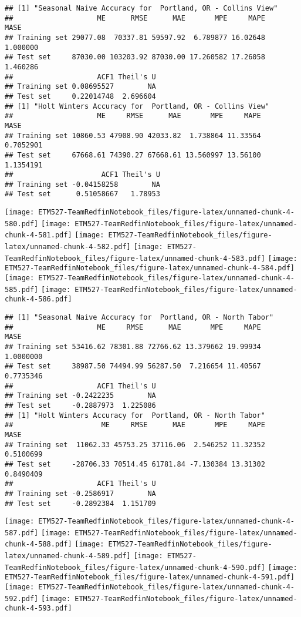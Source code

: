 \documentclass[]{article}
\begin{document}
\begin{verbatim}
## [1] "Seasonal Naive Accuracy for  Portland, OR - Collins View"
##                    ME      RMSE      MAE       MPE     MAPE     MASE
## Training set 29077.08  70337.81 59597.92  6.789877 16.02648 1.000000
## Test set     87030.00 103203.92 87030.00 17.260582 17.26058 1.460286
##                    ACF1 Theil's U
## Training set 0.08695527        NA
## Test set     0.22014748  2.696604
## [1] "Holt Winters Accuracy for  Portland, OR - Collins View"
##                    ME     RMSE      MAE       MPE     MAPE      MASE
## Training set 10860.53 47908.90 42033.82  1.738864 11.33564 0.7052901
## Test set     67668.61 74390.27 67668.61 13.560997 13.56100 1.1354191
##                     ACF1 Theil's U
## Training set -0.04158258        NA
## Test set      0.51058667   1.78953
\end{verbatim}

\texttt{[image: ETM527-TeamRedfinNotebook\_files/figure-latex/unnamed-chunk-4-580.pdf]}
\texttt{[image: ETM527-TeamRedfinNotebook\_files/figure-latex/unnamed-chunk-4-581.pdf]}
\texttt{[image: ETM527-TeamRedfinNotebook\_files/figure-latex/unnamed-chunk-4-582.pdf]}
\texttt{[image: ETM527-TeamRedfinNotebook\_files/figure-latex/unnamed-chunk-4-583.pdf]}
\texttt{[image: ETM527-TeamRedfinNotebook\_files/figure-latex/unnamed-chunk-4-584.pdf]}
\texttt{[image: ETM527-TeamRedfinNotebook\_files/figure-latex/unnamed-chunk-4-585.pdf]}
\texttt{[image: ETM527-TeamRedfinNotebook\_files/figure-latex/unnamed-chunk-4-586.pdf]}

\begin{verbatim}
## [1] "Seasonal Naive Accuracy for  Portland, OR - North Tabor"
##                    ME     RMSE      MAE       MPE     MAPE      MASE
## Training set 53416.62 78301.88 72766.62 13.379662 19.99934 1.0000000
## Test set     38987.50 74494.99 56287.50  7.216654 11.40567 0.7735346
##                    ACF1 Theil's U
## Training set -0.2422235        NA
## Test set     -0.2887973  1.225086
## [1] "Holt Winters Accuracy for  Portland, OR - North Tabor"
##                     ME     RMSE      MAE       MPE     MAPE      MASE
## Training set  11062.33 45753.25 37116.06  2.546252 11.32352 0.5100699
## Test set     -28706.33 70514.45 61781.84 -7.130384 13.31302 0.8490409
##                    ACF1 Theil's U
## Training set -0.2586917        NA
## Test set     -0.2892384  1.151709
\end{verbatim}

\texttt{[image: ETM527-TeamRedfinNotebook\_files/figure-latex/unnamed-chunk-4-587.pdf]}
\texttt{[image: ETM527-TeamRedfinNotebook\_files/figure-latex/unnamed-chunk-4-588.pdf]}
\texttt{[image: ETM527-TeamRedfinNotebook\_files/figure-latex/unnamed-chunk-4-589.pdf]}
\texttt{[image: ETM527-TeamRedfinNotebook\_files/figure-latex/unnamed-chunk-4-590.pdf]}
\texttt{[image: ETM527-TeamRedfinNotebook\_files/figure-latex/unnamed-chunk-4-591.pdf]}
\texttt{[image: ETM527-TeamRedfinNotebook\_files/figure-latex/unnamed-chunk-4-592.pdf]}
\texttt{[image: ETM527-TeamRedfinNotebook\_files/figure-latex/unnamed-chunk-4-593.pdf]}
\end{document}
